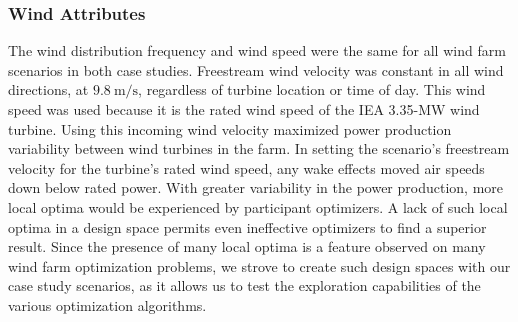 \subsubsection{Wind Attributes}

	The wind distribution frequency and wind speed were the same for all wind farm scenarios in both case studies.
	Freestream wind velocity was constant in all wind directions, at $9.8\ \textrm{m/s}$, regardless of turbine location or time of day.
	This wind speed was used because it is the rated wind speed of the IEA 3.35-MW wind turbine.
	Using this incoming wind velocity maximized power production variability between wind turbines in the farm.
	In setting the scenario's freestream velocity for the turbine's rated wind speed, any wake effects moved air speeds down below rated power.
	With greater variability in the power production, more local optima would be experienced by participant optimizers.
	A lack of such local optima in a design space permits even ineffective optimizers to find a superior result.
	Since the presence of many local optima is a feature observed on many wind farm optimization problems, we strove to create such design spaces with our case study scenarios,  as it allows us to test the exploration capabilities of the various optimization algorithms.
	

